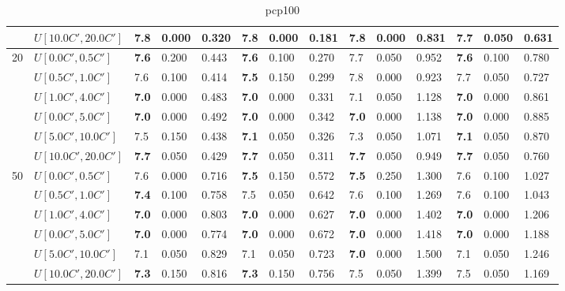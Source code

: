 \begin{table}[h]
{\begin{tabular}{|l|l||l|l|l||l|l|l||l|l|l||l|l|l|}
       & $U[10.0C',20.0C']$ & 7.8 & 0.000 & 0.320 & 7.8 & 0.000 & 0.181 & 7.8 & 0.000 & 0.831 & \textbf{7.7} & 0.050 & 0.631 \\
      \hline\hline
      \multirow{6}{*}{20} & $U[0.0C',0.5C']$ & \textbf{7.6} & 0.200 & 0.443 & \textbf{7.6} & 0.100 & 0.270 & 7.7 & 0.050 & 0.952 & \textbf{7.6} & 0.100 & 0.780 \\
       & $U[0.5C',1.0C']$ & 7.6 & 0.100 & 0.414 & \textbf{7.5} & 0.150 & 0.299 & 7.8 & 0.000 & 0.923 & 7.7 & 0.050 & 0.727 \\
       & $U[1.0C',4.0C']$ & \textbf{7.0} & 0.000 & 0.483 & \textbf{7.0} & 0.000 & 0.331 & 7.1 & 0.050 & 1.128 & \textbf{7.0} & 0.000 & 0.861 \\
       & $U[0.0C',5.0C']$ & \textbf{7.0} & 0.000 & 0.492 & \textbf{7.0} & 0.000 & 0.342 & \textbf{7.0} & 0.000 & 1.138 & \textbf{7.0} & 0.000 & 0.885 \\
       & $U[5.0C',10.0C']$ & 7.5 & 0.150 & 0.438 & \textbf{7.1} & 0.050 & 0.326 & 7.3 & 0.050 & 1.071 & \textbf{7.1} & 0.050 & 0.870 \\
       & $U[10.0C',20.0C']$ & \textbf{7.7} & 0.050 & 0.429 & \textbf{7.7} & 0.050 & 0.311 & \textbf{7.7} & 0.050 & 0.949 & \textbf{7.7} & 0.050 & 0.760 \\
      \hline\hline
      \multirow{6}{*}{50} & $U[0.0C',0.5C']$ & 7.6 & 0.000 & 0.716 & \textbf{7.5} & 0.150 & 0.572 & \textbf{7.5} & 0.250 & 1.300 & 7.6 & 0.100 & 1.027 \\
       & $U[0.5C',1.0C']$ & \textbf{7.4} & 0.100 & 0.758 & 7.5 & 0.050 & 0.642 & 7.6 & 0.100 & 1.269 & 7.6 & 0.100 & 1.043 \\
       & $U[1.0C',4.0C']$ & \textbf{7.0} & 0.000 & 0.803 & \textbf{7.0} & 0.000 & 0.627 & \textbf{7.0} & 0.000 & 1.402 & \textbf{7.0} & 0.000 & 1.206 \\
       & $U[0.0C',5.0C']$ & \textbf{7.0} & 0.000 & 0.774 & \textbf{7.0} & 0.000 & 0.672 & \textbf{7.0} & 0.000 & 1.418 & \textbf{7.0} & 0.000 & 1.188 \\
       & $U[5.0C',10.0C']$ & 7.1 & 0.050 & 0.829 & 7.1 & 0.050 & 0.723 & \textbf{7.0} & 0.000 & 1.500 & 7.1 & 0.050 & 1.246 \\
       & $U[10.0C',20.0C']$ & \textbf{7.3} & 0.150 & 0.816 & \textbf{7.3} & 0.150 & 0.756 & 7.5 & 0.050 & 1.399 & 7.5 & 0.050 & 1.169 \\
      \hline
      \end{tabular}
      }
      \caption{pcp100}
      \label{tab:pcp100}\end{table}
      
